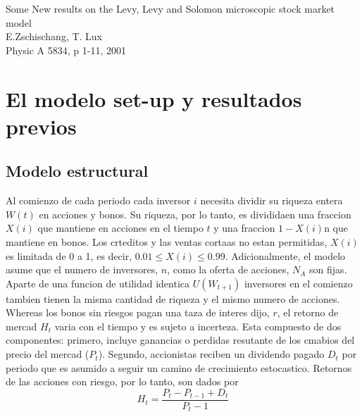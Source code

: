 \documentclass[12pts]{article}
\begin{document}
\begin{center}
Some New results on the Levy, Levy and Solomon microscopic stock market model\\
\small{E.Zschischang, T. Lux}\\
\small{Physic A 5834, p 1-11, 2001}
\end{center}
\section*{El modelo set-up y resultados previos}
\subsection*{Modelo estructural}
\quad Al comienzo de cada periodo cada inversor $i$ necesita dividir su riqueza entera $W(t)$ en acciones y bonos. Su riqueza, por lo tanto, es divididaen una fraccion $X(i)$ que mantiene en acciones en el tiempo $t$ y una fraccion $1-X(i)$n que mantiene en bonos. Los crteditos y las ventas cortaas no estan permitidas, $X(i)$ es limitada de 0 a 1, es decir, $0.01\leq X(i)\leq 0.99$. Adicionalmente, el modelo asume que el numero de inversores, $n$, como la oferta de acciones, $N_A$ son fijas. Aparte de una funcion de utilidad identica $U(W_{t+1})$ inversores en el comienzo tambien tienen la misma cantidad de riqueza y el mismo numero de acciones. Whereas los bonos sin riesgos pagan una taza de interes dijo, $r$, el retorno de mercad $H_t$ varia con el tiempo y es sujeto a incerteza. Esta compuesto de dos componentes: primero, incluye ganancias o perdidas resutante de los cmabios del precio del mercad ($P_t$). Segundo, accionistas reciben un dividendo pagado $D_t$ por periodo que es asumido a seguir un camino de crecimiento estocastico. Retornos de las acciones con riesgo, por lo tanto, son dados por
\begin{equation}
H_t=\frac{P_t-P_{t-1}+D_t}{P_t-1}
\end{equation}
\end{document}
